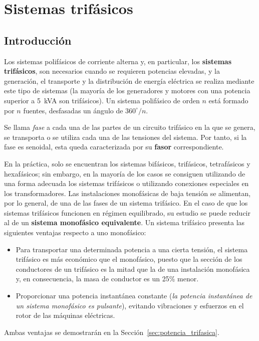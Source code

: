 \chapter{Sistemas trifásicos}
	
	
	\section{Introducción}
	Los sistemas polifásicos de corriente alterna y, en particular, los \textbf{sistemas trifásicos}, son necesarios cuando se requieren potencias elevadas, y la generación, el transporte y la distribución de energía eléctrica se realiza mediante este tipo de sistemas (la mayoría de los generadores y motores con una potencia superior a 5~kVA son trifásicos). Un sistema polifásico de orden $n$ está formado por $n$ fuentes, desfasadas un ángulo de $360^\circ/n$. 
	\begin{remark}
		Se llama \textit{fase} a cada una de las partes de un circuito trifásico en la que se genera, se transporta o se utiliza cada una de las tensiones del sistema. Por tanto, si la fase es senoidal, esta queda caracterizada por su \textbf{fasor} correspondiente.
	\end{remark}
	
	En la práctica, solo se encuentran los sistemas bifásicos, trifásicos, tetrafásicos y hexafásicos; sin embargo, en la mayoría de los casos se consiguen utilizando de una forma adecuada los sistemas trifásicos o utilizando conexiones especiales en los transformadores. Las instalaciones monofásicas de baja tensión se alimentan, por lo general, de una de las fases de un sistema trifásico. En el caso de que los sistemas trifásicos funcionen en régimen equilibrado, su estudio se puede reducir al de un \textbf{sistema monofásico equivalente}. Un sistema trifásico presenta las siguientes ventajas respecto a uno monofásico:
	\begin{itemize}
		\item Para transportar una determinada potencia a una cierta tensión, el sistema trifásico es más económico que el monofásico, puesto que la sección de los conductores de un trifásico es la mitad que la de una instalación monofásica y, en consecuencia, la masa de conductor es un 25\% menor.
		\item Proporcionar una potencia instantánea constante (\emph{la potencia instantánea de un sistema monofásico es pulsante}), evitando vibraciones y esfuerzos en el rotor de las máquinas eléctricas.
	\end{itemize}
	Ambas ventajas se demostrarán en la Sección~\ref{sec:potencia_trifasica}.
	
